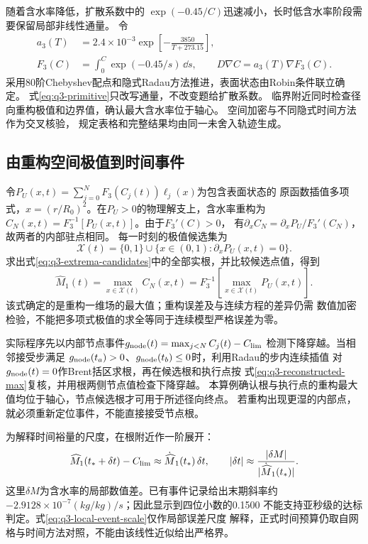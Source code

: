 随着含水率降低，扩散系数中的
$\exp(-0.45/C)$迅速减小，长时低含水率阶段需要保留局部非线性通量。
令
\begin{equation}
 \begin{aligned}
 a_3(T)&=2.4\times10^{-3}
 \exp\!\left[-\frac{3850}{T+273.15}\right],\\
 F_3(C)&=\int_0^C\exp(-0.45/s)\,\dd s,\qquad
 D\nabla C=a_3(T)\nabla F_3(C).
 \end{aligned}
 \label{eq:q3-primitive}
\end{equation}
采用80阶Chebyshev配点和隐式Radau方法推进，表面状态由Robin条件联立确定。
式\eqref{eq:q3-primitive}只改写通量，不改变题给扩散系数。
临界附近同时检查径向重构极值和边界值，确认最大含水率位于轴心。
空间加密与不同隐式时间方法作为交叉核验，
规定表格和完整结果均由同一未舍入轨迹生成。

\subsection{由重构空间极值到时间事件}

令$P_U(x,t)=\sum_{j=0}^N F_3(C_j(t))\ell_j(x)$为包含表面状态的
原函数插值多项式，$x=(r/R_0)^2$。在$P_U>0$的物理解支上，含水率重构为
$C_N(x,t)=F_3^{-1}[P_U(x,t)]$。由于$F_3'(C)>0$，
有$\partial_x C_N=\partial_xP_U/F_3'(C_N)$，故两者的内部驻点相同。
每一时刻的极值候选集为
\begin{equation}
 \mathcal X(t)=\{0,1\}\cup
 \{x\in(0,1):\partial_xP_U(x,t)=0\}.
 \label{eq:q3-extrema-candidates}
\end{equation}
求出式\eqref{eq:q3-extrema-candidates}中的全部实根，并比较候选点值，得到
\begin{equation}
 \widehat M_1(t)=\max_{x\in\mathcal X(t)}C_N(x,t)
 =F_3^{-1}\!\left[\max_{x\in\mathcal X(t)}P_U(x,t)\right].
 \label{eq:q3-reconstructed-max}
\end{equation}
该式确定的是重构一维场的最大值；重构误差及与连续方程的差异仍需
数值加密检验，不能把多项式极值的求全等同于连续模型严格误差为零。

实际程序先以内部节点事件$g_{\rm node}(t)=\max_{j<N}C_j(t)-C_{\rm lim}$
检测下降穿越。当相邻接受步满足
$g_{\rm node}(t_a)>0$、$g_{\rm node}(t_b)\le0$时，利用Radau的步内连续插值
对$g_{\rm node}(t)=0$作Brent括区求根，再在候选根和执行点按
式\eqref{eq:q3-reconstructed-max}复核，并用根两侧节点值检查下降穿越。
本算例确认根与执行点的重构最大值均位于轴心，节点候选根才可用于所述径向终点。
若重构出现更湿的内部点，就必须重新定位事件，不能直接接受节点根。

为解释时间裕量的尺度，在根附近作一阶展开：
\begin{equation}
 \widehat M_1(t_*+\delta t)-C_{\rm lim}
 \approx\dot{\widehat M}_1(t_*)\,\delta t,
 \qquad
 |\delta t|\approx\frac{|\delta M|}{|\dot{\widehat M}_1(t_*)|}.
 \label{eq:q3-local-event-scale}
\end{equation}
这里$\delta M$为含水率的局部数值差。已有事件记录给出末期斜率约
$-2.9128\times10^{-7}\unit{(kg/kg)/s}$；因此显示到四位小数的0.1500
不能支持亚秒级的达标判定。式\eqref{eq:q3-local-event-scale}仅作局部误差尺度
解释，正式时间预算仍取自网格与时间方法对照，不能由该线性近似给出严格界。

